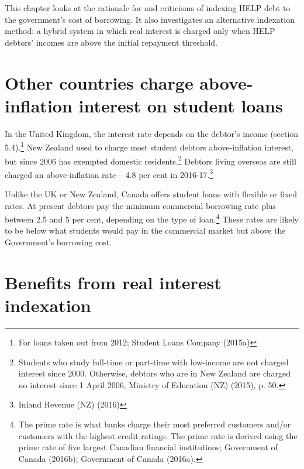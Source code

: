 \documentclass[]{book}
\begin{document}
This chapter looks at the rationale for and criticisms of indexing HELP debt to the government's cost of borrowing. It also investigates an alternative indexation method: a hybrid system in which real interest is charged only when HELP debtors' incomes are above the initial repayment threshold.

\section{Other countries charge above-inflation interest on student loans}\label{other-countries-charge-above-inflation-interest-on-student-loans}

In the United Kingdom, the interest rate depends on the debtor's income (section 5.4).\footnote{For loans taken out from 2012; Student Loans Company (2015a)} New Zealand used to charge most student debtors above-inflation interest, but since 2006 has exempted domestic residents.\footnote{Students who study full-time or part-time with low-income are not charged interest since 2000. Otherwise, debtors who are in New Zealand are charged no interest since 1 April 2006, Ministry of Education (NZ) (2015), p. 50.} Debtors living overseas are still charged an above-inflation rate -- 4.8 per cent in 2016-17.\footnote{Inland Revenue (NZ) (2016)}

Unlike the UK or New Zealand, Canada offers student loans with flexible or fixed rates. At present debtors pay the minimum commercial borrowing rate plus between 2.5 and 5 per cent, depending on the type of loan.\footnote{The prime rate is what banks charge their most preferred customers and/or customers with the highest credit ratings. The prime rate is derived using the prime rate of five largest Canadian financial institutions; Government of Canada (2016b); Government of Canada (2016a).} These rates are likely to be below what students would pay in the commercial market but above the Government's borrowing cost.

\section{Benefits from real interest indexation}\label{benefits-from-real-interest-indexation}
\end{document}

